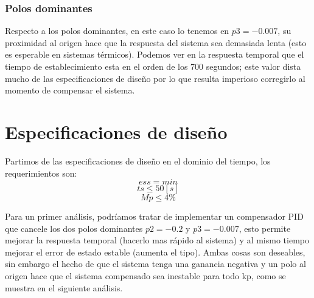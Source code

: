 \documentclass[12pt]{article}
\begin{document}
	\subsubsection{Polos dominantes}
	Respecto a los polos dominantes, en este caso lo tenemos en $p3=-0.007$, su proximidad al origen hace que la respuesta del sistema sea demasiada lenta (esto es esperable en sistemas térmicos). Podemos ver en la respuesta temporal que el tiempo de establecimiento esta en el orden de los 700 segundos; este valor dista mucho de las especificaciones de diseño por lo que resulta imperioso corregirlo al momento de compensar el sistema.\newpage
	
\section{Especificaciones de diseño}
	Partimos de las especificaciones de diseño en el dominio del tiempo, los requerimientos son:
	\begin{equation}
		ess=min
	\end{equation}
	\begin{equation}
		ts\leq 50[s]
	\end{equation}
	\begin{equation}
		Mp\leq 4 \%
	\end{equation}
	
	Para un primer análisis, podríamos tratar de implementar un compensador PID que cancele los dos polos dominantes $p2=-0.2$ y $p3=-0.007$, esto permite mejorar la respuesta temporal (hacerlo mas rápido al sistema) y al mismo tiempo mejorar el error de estado estable (aumenta el tipo). Ambas cosas son deseables, sin embargo el hecho de que el sistema tenga una ganancia negativa y un polo al origen hace que el sistema compensado sea inestable para todo kp, como se muestra en el siguiente análisis.
	\newpage
\end{document}
